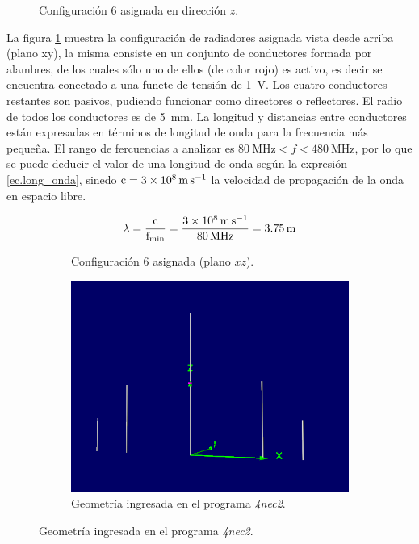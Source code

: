 \begin{figure}[H]
	\centering
	\scalebox{0.7}{}
	\caption{Configuración 6 asignada en dirección $z$.}
	\label{fig.config_z}
\end{figure}	


La figura \ref{fig.config_z} muestra la configuración de radiadores asignada vista desde arriba (plano xy), la misma consiste en un conjunto de conductores formada por alambres, de los cuales sólo uno de ellos (de color rojo) es activo, es decir se encuentra conectado a una funete de tensión de \SI{1}{\volt}. Los cuatro conductores restantes son pasivos, pudiendo funcionar como directores o reflectores. El radio de todos los conductores es de \SI{5}{\milli\meter}.
La longitud y distancias entre conductores están expresadas en términos de longitud de onda para la frecuencia más pequeña. El rango de fercuencias a analizar es $\SI{80}{\mega\hertz} < f < \SI{480}{\mega\hertz}$, por lo que se puede deducir el valor de una longitud de onda según la expresión \eqref{ec.long_onda}, sinedo $\rm{c}=\SI{3e8}{\meter\per\second}$ la velocidad de propagación de la onda en espacio libre.

\begin{equation}
	\centering
	\lambda = \frac{\rm{c}}{\rm{f_{min}}} = \frac{ \SI{3e8}{\meter\per\second} } { \SI{80}{\mega\hertz} } = \SI{3.75}{\meter}
	\label{ec.long_onda}
\end{equation} 

\begin{figure}[H]
	\begin{subfigure}{0.5\textwidth}
		\scalebox{0.7}{}
		\caption{Configuración 6 asignada (plano $xz$).}
		\label{fig.config_xz}
	\end{subfigure}
	\quad
	\begin{subfigure}{0.5\textwidth}
		\includegraphics[scale=0.4]{imagenes/2_geometria.png}
		\caption{Geometría ingresada en el programa \textit{4nec2}.}
		\label{fig.geometria}
	\end{subfigure}
\end{figure}
 
